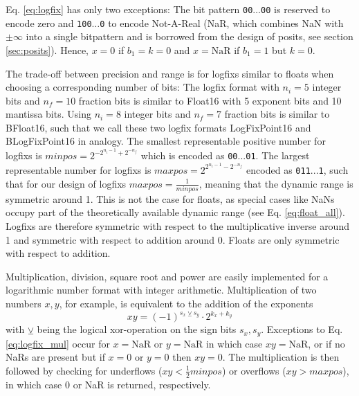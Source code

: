 Eq. \ref{eq:logfix} has only two exceptions: The bit pattern \texttt{00$\dots$00} is reserved to encode zero and \texttt{100$\dots$0}
to encode Not-A-Real (NaR, which combines NaN with $\pm \infty$ into a single bitpattern and is borrowed from the design of
posits, see section \ref{sec:posits}). Hence, $x=0$ if $b_1 = k = 0$ and $x = \text{NaR}$ if $b_1 = 1$ but $k=0$.

The trade-off between precision and range is for logfixs similar to floats when choosing a corresponding number of bits:
The logfix format with $n_i=5$ integer bits and $n_f=10$ fraction bits is similar to Float16 with 5
exponent bits and 10 mantissa bits. Using $n_i=8$ integer bits and $n_f=7$ fraction bits is similar to BFloat16, such that
we call these two logfix formats LogFixPoint16 and BLogFixPoint16 in analogy. The smallest representable positive number
for logfixs is $minpos = 2^{-2^{n_i-1} + 2^{-n_f}}$ which is encoded as \texttt{00$...$01}. The largest representable number
for logfixs is $maxpos = 2^{2^{n_i-1} - 2^{-n_f}}$ encoded as \texttt{011$...$1}, such that for our design of logfixs
$maxpos = \tfrac{1}{minpos}$, meaning that the dynamic range is symmetric around 1. This is not the case for floats,
as special cases like NaNs occupy part of the theoretically available dynamic range (see Eq. \ref{eq:float_all}).
Logfixs are therefore symmetric with respect to the multiplicative inverse around 1 and symmetric with respect to addition
around 0. Floats are only symmetric with respect to addition.

Multiplication, division, square root and power are easily implemented for a logarithmic number format with integer arithmetic. 
Multiplication of two numbers $x,y$, for example, is equivalent to the addition of the exponents
\begin{equation}
xy = (-1)^{s_x \veebar s_y} \cdot 2^{k_x + k_y}
\label{eq:logfix_mul}
\end{equation}
with $\veebar$ being the logical xor-operation on the sign bits $s_x,s_y$. Exceptions to Eq. \ref{eq:logfix_mul} occur for $x = \text{NaR}$
or $y = \text{NaR}$ in which case $xy = \text{NaR}$, or if no NaRs are present but if $x=0$ or $y=0$ then $xy= 0$. The multiplication 
is then followed by checking for underflows ($xy < \tfrac{1}{2}minpos$) or overflows ($xy > maxpos$), in which case 0 or NaR is returned,
respectively. 

